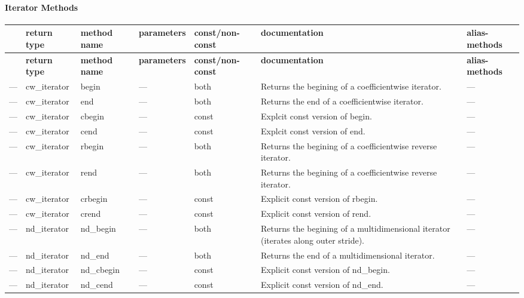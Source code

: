 \paragraph*{Iterator Methods}

\tabulinesep=1mm
\begin{longtabu} spread 0pt [c]{*7{|X[-1]}|}
\hline
{}&{\bf return type }&{\bf method name }&{\bf parameters }&{\bf const/non-\/const }&{\bf documentation }&{\bf alias-\/methods  }\\
\endfirsthead
\hline
\endfoot
\hline
{}&{\bf return type }&{\bf method name }&{\bf parameters }&{\bf const/non-\/const }&{\bf documentation }&{\bf alias-\/methods  }\\
\endhead
--- &cw\+\_\+iterator &begin &--- &both &Returns the begining of a coefficientwise iterator. &--- \\
--- &cw\+\_\+iterator &end &--- &both &Returns the end of a coefficientwise iterator. &--- \\
--- &cw\+\_\+iterator &cbegin &--- &const &Explcit const version of begin. &--- \\
--- &cw\+\_\+iterator &cend &--- &const &Explcit const version of end. &--- \\
--- &cw\+\_\+iterator &rbegin &--- &both &Returns the begining of a coefficientwise reverse iterator. &--- \\
--- &cw\+\_\+iterator &rend &--- &both &Returns the begining of a coefficientwise reverse iterator. &--- \\
--- &cw\+\_\+iterator &crbegin &--- &const &Explicit const version of rbegin. &--- \\
--- &cw\+\_\+iterator &crend &--- &const &Explicit const version of rend. &--- \\
--- &nd\+\_\+iterator &nd\+\_\+begin &--- &both &Returns the begining of a multidimensional iterator (iterates along outer stride). &--- \\
--- &nd\+\_\+iterator &nd\+\_\+end &--- &both &Returns the end of a multidimensional iterator. &--- \\
--- &nd\+\_\+iterator &nd\+\_\+cbegin &--- &const &Explicit const version of nd\+\_\+begin. &--- \\
--- &nd\+\_\+iterator &nd\+\_\+cend &--- &const &Explicit const version of nd\+\_\+end. &--- \\

\end{longtabu}
